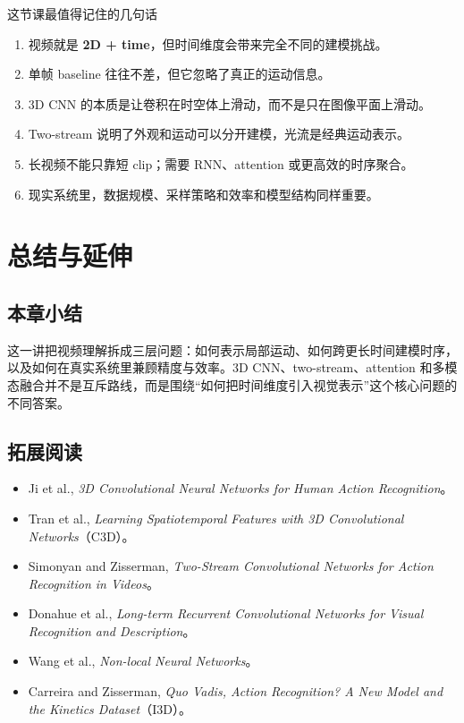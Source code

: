 \documentclass[a4paper]{article}
\begin{document}
\begin{importantbox}{这节课最值得记住的几句话}
\begin{enumerate}
    \item 视频就是 \textbf{2D + time}，但时间维度会带来完全不同的建模挑战。
    \item 单帧 baseline 往往不差，但它忽略了真正的运动信息。
    \item 3D CNN 的本质是让卷积在时空体上滑动，而不是只在图像平面上滑动。
    \item Two-stream 说明了外观和运动可以分开建模，光流是经典运动表示。
    \item 长视频不能只靠短 clip；需要 RNN、attention 或更高效的时序聚合。
    \item 现实系统里，数据规模、采样策略和效率和模型结构同样重要。
\end{enumerate}
\end{importantbox}

\section{总结与延伸}

\subsection{本章小结}
这一讲把视频理解拆成三层问题：如何表示局部运动、如何跨更长时间建模时序，以及如何在真实系统里兼顾精度与效率。3D CNN、two-stream、attention 和多模态融合并不是互斥路线，而是围绕“如何把时间维度引入视觉表示”这个核心问题的不同答案。

\subsection{拓展阅读}

\begin{itemize}
    \item Ji et al., \textit{3D Convolutional Neural Networks for Human Action Recognition}。
    \item Tran et al., \textit{Learning Spatiotemporal Features with 3D Convolutional Networks}（C3D）。
    \item Simonyan and Zisserman, \textit{Two-Stream Convolutional Networks for Action Recognition in Videos}。
    \item Donahue et al., \textit{Long-term Recurrent Convolutional Networks for Visual Recognition and Description}。
    \item Wang et al., \textit{Non-local Neural Networks}。
    \item Carreira and Zisserman, \textit{Quo Vadis, Action Recognition? A New Model and the Kinetics Dataset}（I3D）。
\end{itemize}
\end{document}
